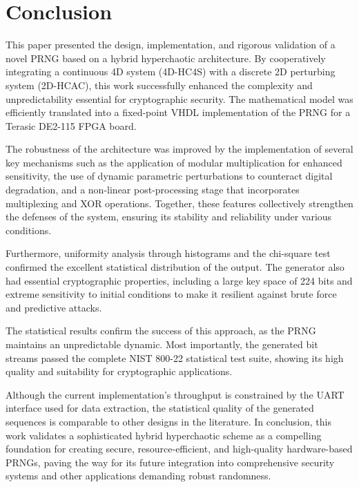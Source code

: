 \documentclass[preprint,12pt]{elsarticle}
\begin{document}
\section{Conclusion}\label{sec_6}
This paper presented the design, implementation, and rigorous validation of a novel PRNG based on a hybrid hyperchaotic architecture. By cooperatively integrating a continuous 4D system (4D-HC4S) with a discrete 2D perturbing system (2D-HCAC), this work successfully enhanced the complexity and unpredictability essential for cryptographic security. The mathematical model was efficiently translated into a fixed-point VHDL implementation of the PRNG for a Terasic DE2-115 FPGA board. 

The robustness of the architecture was improved by the implementation of several key mechanisms such as the application of modular multiplication for enhanced sensitivity, the use of dynamic parametric perturbations to counteract digital degradation, and a non-linear post-processing stage that incorporates multiplexing and XOR operations. Together, these features collectively strengthen the defenses of the system, ensuring its stability and reliability under various conditions.

Furthermore, uniformity analysis through histograms and the chi-square test confirmed the excellent statistical distribution of the output. The generator also had essential cryptographic properties, including a large key space of 224 bits and extreme sensitivity to initial conditions to make it resilient against brute force and predictive attacks.

The statistical results confirm the success of this approach, as the PRNG maintains an unpredictable dynamic. Most importantly, the generated bit streams passed the complete NIST 800-22 statistical test suite, showing its high quality and suitability for cryptographic applications.

Although the current implementation's throughput is constrained by the UART interface used for data extraction, the statistical quality of the generated sequences is comparable to other designs in the literature. In conclusion, this work validates a sophisticated hybrid hyperchaotic scheme as a compelling foundation for creating secure, resource-efficient, and high-quality hardware-based PRNGs, paving the way for its future integration into comprehensive security systems and other applications demanding robust randomness.
\end{document}
